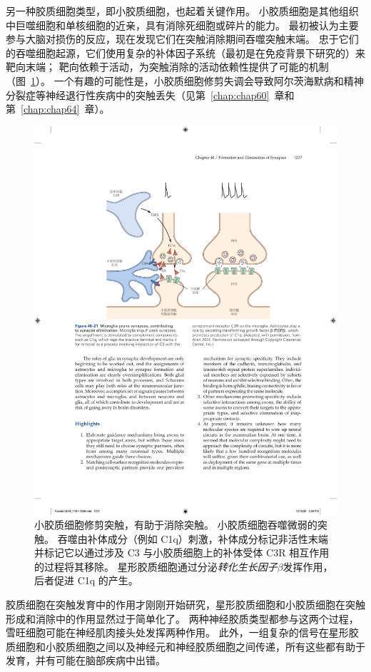 另一种胶质细胞类型，即小胶质细胞，也起着关键作用。
小胶质细胞是其他组织中巨噬细胞和单核细胞的近亲，具有消除死细胞或碎片的能力。
最初被认为主要参与大脑对损伤的反应，现在发现它们在突触消除期间吞噬突触末端。
忠于它们的吞噬细胞起源，它们使用复杂的补体因子系统（最初是在免疫背景下研究的）来靶向末端；
靶向依赖于活动，为突触消除的活动依赖性提供了可能的机制（图~\ref{fig:48_21}）。
一个有趣的可能性是，小胶质细胞修剪失调会导致阿尔茨海默病和精神分裂症等神经退行性疾病中的突触丢失（见第~\ref{chap:chap60}~章和第~\ref{chap:chap64}~章）。


\begin{figure}[htbp]
	\centering
	\includegraphics[width=0.93\linewidth]{chap48/fig_48_21}
	\caption{小胶质细胞修剪突触，有助于消除突触。
		小胶质细胞吞噬微弱的突触。
		吞噬由补体成分（例如 C1q）刺激，补体成分标记非活性末端并标记它以通过涉及 C3 与小胶质细胞上的补体受体 C3R 相互作用的过程将其移除。
		星形胶质细胞通过分泌\textit{转化生长因子$\beta$}发挥作用，后者促进 C1q 的产生\cite{allen2014astrocyte}。}
	\label{fig:48_21}
\end{figure}


胶质细胞在突触发育中的作用才刚刚开始研究，星形胶质细胞和小胶质细胞在突触形成和消除中的作用显然过于简单化了。
两种神经胶质类型都参与这两个过程，雪旺细胞可能在神经肌肉接头处发挥两种作用。
此外，一组复杂的信号在星形胶质细胞和小胶质细胞之间以及神经元和神经胶质细胞之间传递，所有这些都有助于发育，并有可能在脑部疾病中出错。



